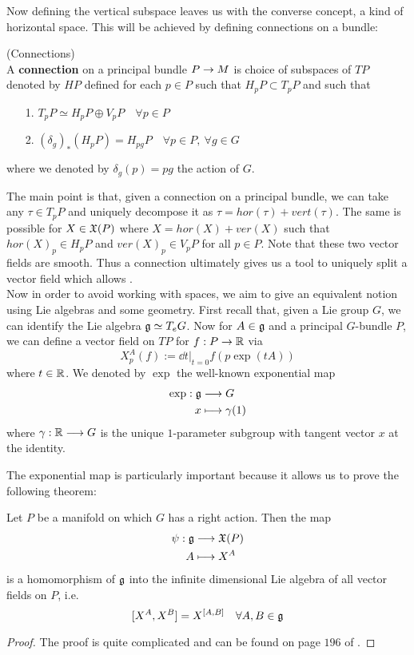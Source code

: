 Now defining the vertical subspace leaves us with the converse concept, a kind of horizontal space. This will be achieved by defining connections on a bundle:

\begin{definition}
\label{Connections}
(Connections)\\
  A \textbf{connection} on a principal bundle $P \rightarrow M$ is choice of subspaces of $TP$ denoted by $HP$ defined for each $p \in P$ such that $H_pP \subset T_pP$ and such that
  \begin{itemize}
    \item[1.] $T_pP \simeq H_pP \oplus V_pP \quad \forall p\in P$
    \item[2.] $(\delta_g)_* (H_pP) = H_{pg}P \quad \forall p \in P, \ \forall g \in G$
  \end{itemize}
  where we denoted by $\delta_g(p) = pg$ the action of $G$.
\end{definition}

The main point is that, given a connection on a principal bundle, we can take any $\tau \in T_pP$ and uniquely decompose it as $\tau = hor(\tau) + vert(\tau)$. The same is possible for $X\in \mathfrak{X}(P)$ where $X = hor(X) + ver(X)$ such that $hor(X)_p \in H_pP$ and $ver(X)_p \in V_pP$ for all $p\in P$. Note that these two vector fields are smooth. Thus a connection ultimately gives us a tool to uniquely split a vector field which allows .\\


Now in order to avoid working with spaces, we aim to give an equivalent notion using Lie algebras and some geometry. First recall that, given a Lie group $G$, we can identify the Lie algebra $\mathfrak{g} \simeq T_eG$. Now for $A \in \mathfrak{g}$ and a principal $G$-bundle $P$, we can define a vector field on $TP$ for $f:P\rightarrow \mathbb{R}$ via
$$ X^A_p(f) := \dd{}{t}\Big|_{t=0} f(p \exp(tA)) $$
where $t\in \mathbb{R}$. We denoted by $\exp$ the well-known exponential map
\begin{align*}
  \exp: \mathfrak{g} &\longrightarrow G\\
  x &\longmapsto \gamma(1)
\end{align*}
where $\gamma:\mathbb{R}\longrightarrow G$ is the unique $1$-parameter subgroup with tangent vector $x$ at the identity.

The exponential map is particularly important because it allows us to prove the following theorem:

\begin{theo}
  Let $P$ be a manifold on which $G$ has a right action. Then the map
  \begin{align*}
    \psi : \mathfrak{g} &\longrightarrow \mathfrak{X}(P)\\
    A &\longmapsto X^A
  \end{align*}
  is a homomorphism of $\mathfrak{g}$ into the infinite dimensional Lie algebra of all vector fields on $P$, i.e.
  $$ [X^A, X^B] = X^{[A,B]} \quad \forall A,B \in \mathfrak{g} $$
\begin{proof}
  The proof is quite complicated and can be found on page $196$ of .
\end{proof}
\end{theo}

